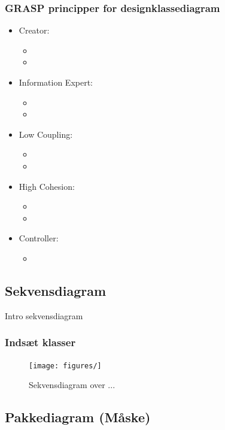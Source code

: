 \documentclass[../main.tex]{subfiles}
\begin{document}
\subsubsection{GRASP principper for designklassediagram}
\begin{flushleft}
\begin{itemize}
    \item Creator: 
    \begin{itemize}
        \item  
        \item  
    \end{itemize}
    \item Information Expert:
    \begin{itemize}
        \item  
        \item 
    \end{itemize}
    \item Low Coupling:
    \begin{itemize}
        \item
        \item
    \end{itemize}
    \item High Cohesion:
    \begin{itemize}
        \item
        \item
    \end{itemize}
    \item Controller: 
    \begin{itemize}
        \item 
    \end{itemize}
\end{itemize}
\end{flushleft}


\subsection{Sekvensdiagram }
\begin{flushleft}
Intro sekvensdiagram
\end{flushleft}

\subsubsection{Indsæt klasser}
\begin{figure}[H]
    \centering
   {\texttt{[image: figures/]}}
    \caption{Sekvensdiagram over ...}
    \label{fig:sekvensdia1}
\end{figure}


\subsection{Pakkediagram (Måske) }
\end{document}
